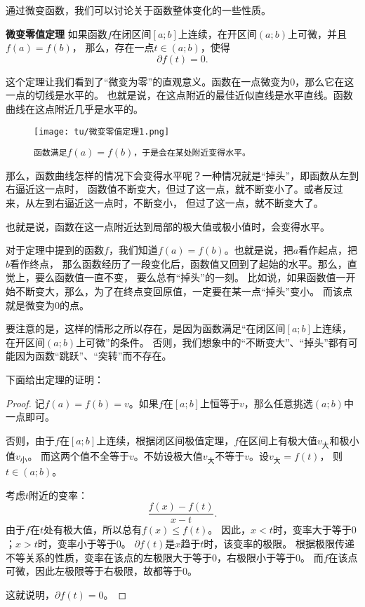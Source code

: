 \documentclass[12pt,UTF8]{ctexbook}
\begin{document}
通过微变函数，我们可以讨论关于函数整体变化的一些性质。

\begin{tm}{\textbf{微变零值定理}}\label{tm:2-4-0}
    如果函数$f$在闭区间$[a; b]$上连续，在开区间$(a; b)$上可微，并且$f(a) = f(b)$，
    那么，存在一点$t\in(a; b)$，使得
    $$ \partial f(t) = 0.$$
\end{tm}

这个定理让我们看到了“微变为零”的直观意义。函数在一点微变为$0$，那么它在这一点的切线是水平的。
也就是说，在这点附近的最佳近似直线是水平直线。函数曲线在这点附近几乎是水平的。

\begin{figure}[h]
    \centering
    \texttt{[image: tu/微变零值定理1.png]}    
    \caption*{\texttt{函数满足}$f(a) = f(b)$\texttt{，于是会在某处附近变得水平。}}
\end{figure}

那么，函数曲线怎样的情况下会变得水平呢？一种情况就是“掉头”，即函数从左到右逼近这一点时，
函数值不断变大，但过了这一点，就不断变小了。或者反过来，从左到右逼近这一点时，不断变小，
但过了这一点，就不断变大了。

也就是说，函数在这一点附近达到局部的极大值或极小值时，会变得水平。

对于定理中提到的函数$f$，我们知道$f(a) = f(b)$。也就是说，把$a$看作起点，把$b$看作终点，
那么函数经历了一段变化后，函数值又回到了起始的水平。那么，直觉上，要么函数值一直不变，
要么总有“掉头”的一刻。
比如说，如果函数值一开始不断变大，那么，为了在终点变回原值，一定要在某一点“掉头”变小。
而该点就是微变为$0$的点。

要注意的是，这样的情形之所以存在，是因为函数满足“在闭区间$[a; b]$上连续，在开区间$(a; b)$上可微”的条件。
否则，我们想象中的“不断变大”、“掉头”都有可能因为函数“跳跃”、“突转”而不存在。

下面给出定理的证明：
\begin{proof}
    记$f(a) = f(b) = v$。如果$f$在$[a; b]$上恒等于$v$，那么任意挑选$(a; b)$中一点即可。

    否则，由于$f$在$[a; b]$上连续，根据闭区间极值定理，$f$在区间上有极大值$v_{\text{大}}$和极小值$v_{\text{小}}$。
    而这两个值不全等于$v$。不妨设极大值$v_{\text{大}}$不等于$v$。设$v_{\text{大}} = f(t)$，
    则$t\in(a; b)$。

    考虑$t$附近的变率：
    $$ \frac{f(x) - f(t)}{x - t}. $$
    由于$f$在$t$处有极大值，所以总有$f(x) \leqslant f(t)$。
    因此，$x<t$时，变率大于等于$0$；$x>t$时，变率小于等于$0$。
    $\partial f(t)$是$x$趋于$t$时，该变率的极限。
    根据极限传递不等关系的性质，变率在该点的左极限大于等于$0$，右极限小于等于$0$。
    而$f$在该点可微，因此左极限等于右极限，故都等于$0$。
    
    这就说明，$ \partial f(t) = 0$。
\end{proof}
\end{document}
